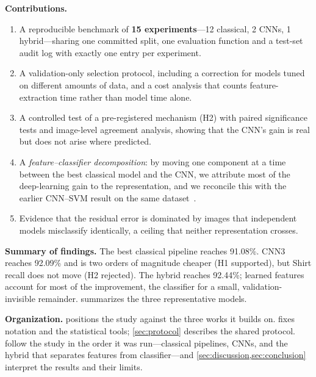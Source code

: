 \documentclass[conference]{IEEEtran}
\begin{document}
\textbf{Contributions.}
\begin{enumerate}
  \item A reproducible benchmark of \textbf{15 experiments}---12 classical, 2 CNNs, 1 hybrid---sharing one committed
        split, one evaluation function and a test-set audit log with exactly one entry per experiment.
  \item A validation-only selection protocol, including a correction for models tuned on different amounts of data,
        and a cost analysis that counts feature-extraction time rather than model time alone.
  \item A controlled test of a pre-registered mechanism (H2) with paired significance tests and image-level agreement
        analysis, showing that the CNN's gain is real but does not arise where predicted.
  \item A \emph{feature--classifier decomposition}: by moving one component at a time between the best classical
        model and the CNN, we attribute most of the deep-learning gain to the representation, and we reconcile this
        with the earlier CNN--SVM result on the same dataset~\cite{agarap2017cnnsvm}.
  \item Evidence that the residual error is dominated by images that independent models misclassify identically, a
        ceiling that neither representation crosses.
\end{enumerate}

\textbf{Summary of findings.} The best classical pipeline reaches 91.08\%. CNN3 reaches 92.09\% and is two orders of
magnitude cheaper (H1 supported), but Shirt recall does not move (H2 rejected). The hybrid reaches 92.44\%; learned
features account for most of the improvement, the classifier for a small, validation-invisible remainder.
 summarizes the three representative models.

\textbf{Organization.}  positions the study against the three works it builds on.
 fixes notation and the statistical tools; \cref{sec:protocol} describes the shared protocol.
 follow the study in the order it was run---classical pipelines, CNNs, and the
hybrid that separates features from classifier---and \cref{sec:discussion,sec:conclusion} interpret the results and
their limits.
\end{document}
